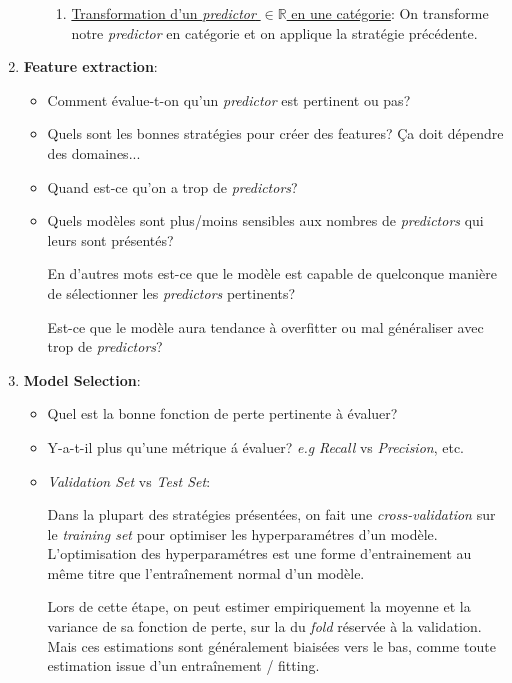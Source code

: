 \documentclass{article}
\begin{document}
\begin{enumerate}
\begin{itemize}[itemsep=1em]
\begin{enumerate}
    \item \underline{Transformation d'un \emph{predictor} $\in{\mathbb{R}}$ en une
      catégorie}: On transforme notre \emph{predictor} en catégorie et on
    applique la stratégie pr\'ec\'edente.

    \end{enumerate}
  \end{itemize}
  \item \textbf{Feature extraction}:
    \begin{itemize}
    \item Comment \'evalue-t-on qu'un \emph{predictor} est pertinent ou pas?
    \item Quels sont les bonnes strat\'egies pour cr\'eer des features? Ça doit
      dépendre des domaines...
    \item Quand est-ce qu'on a trop de \emph{predictors}?
    \item Quels modèles sont plus/moins sensibles aux nombres de
      \emph{predictors} qui leurs sont pr\'esent\'es?

      En d'autres mots est-ce que le modèle est capable de quelconque
      mani\`ere de s\'electionner les \emph{predictors} pertinents?
      
      Est-ce que le modèle aura tendance \`a overfitter ou mal g\'en\'eraliser
      avec trop de \emph{predictors}?
    \end{itemize}
  \item \textbf{Model Selection}:
    \begin{itemize}
      \item Quel est la bonne fonction de perte pertinente \`a \'evaluer?
      \item Y-a-t-il plus qu'une m\'etrique \'a \'evaluer?
        \emph{e.g} \emph{Recall} vs \emph{Precision}, etc.
      \item \emph{Validation Set} vs \emph{Test Set}:
        
        Dans la plupart des stratégies présentées, on fait une
        \emph{cross-validation} sur le \emph{training set} pour optimiser les
        hyperparam\'etres d'un modèle. L'optimisation des hyperparam\'etres est
        une forme d'entrainement au même titre que l'entraînement normal d'un
        modèle.

        Lors de cette \'etape, on peut estimer empiriquement la moyenne et la
        variance de sa fonction de perte, sur la du \emph{fold} réservée à la
        validation. Mais ces estimations sont généralement biaisées vers le bas,
        comme toute estimation issue d'un entraînement / fitting.


\end{itemize}
\end{enumerate}
\end{document}
